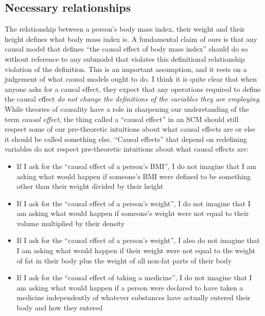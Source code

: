 

\subsection{Necessary relationships}

The relationship between a person's body mass index, their weight and their height defines what body mass index is. A fundamental claim of ours is that any causal model that defines ``the causal effect of body mass index'' should do so without reference to any submodel that violates this definitional relationship violation of the definition. This is an important assumption, and it rests on a judgement of what causal models ought to do. I think it is quite clear that when anyone asks for a causal effect, they expect that any operations required to define the causal effect \emph{do not change the definitions of the variables they are employing}. While theories of causality have a role in sharpening our understanding of the term \emph{causal effect}, the thing called a ``causal effect'' in an SCM should still respect some of our pre-theoretic intuitions about what causal effects are or else it should be called something else. ``Causal effects'' that depend on redefining variables do not respect pre-theoretic intuitions about what causal effects are:

\begin{itemize}
	\item If I ask for the ``causal effect of a person's BMI'', I do not imagine that I am asking what would happen if someone's BMI were defined to be something other than their weight divided by their height
	\item If I ask for the ``causal effect of a person's weight'', I do not imagine that I am asking what would happen if someone's weight were not equal to their volume multiplied by their density
	\item If I ask for the ``causal effect of a person's weight'', I also do not imagine that I am asking what would happen if their weight were not equal to the weight of fat in their body plus the weight of all non-fat parts of their body
	\item If I ask for the ``causal effect of taking a medicine'', I do not imagine that I am asking what would happen if a person were declared to have taken a medicine independently of whatever substances have actually entered their body and how they entered
\end{itemize}

